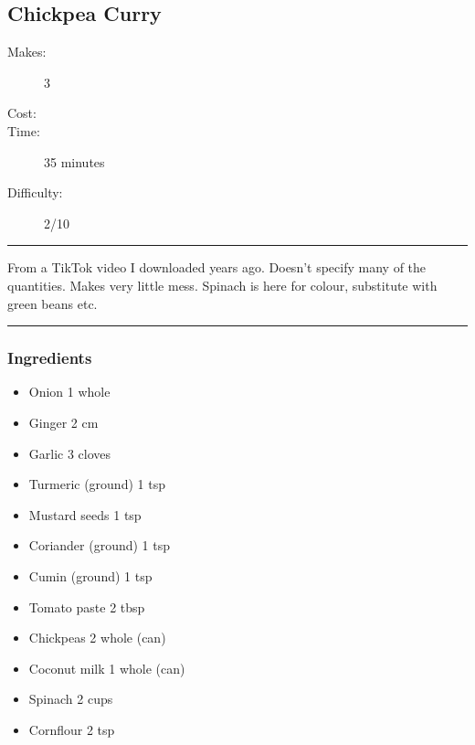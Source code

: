 \documentclass[]{article}
\begin{document}
\subsection*{\center\huge Chickpea Curry}
\begin{description}
\item[Makes:] 3 
\item[Cost:] \textdollar
\item[Time:] 35 minutes
\item[Difficulty:] 2/10
\end{description}
\vspace{0.2cm}\hrule\vspace{0.5cm}
\begin{adjustwidth}{0.5 cm}{0.5 cm}

From a TikTok video I downloaded years ago. Doesn't specify many of the quantities. Makes very little mess. Spinach is here for colour, substitute with green beans etc. \hfill{}\color{black}

\end{adjustwidth}
\vspace{0.5cm}\hrule
\subsubsection*{\Large Ingredients}
\begin{multicols}{2}
\begin{itemize}
 \item Onion \hfill 1 whole
 \item Ginger \hfill 2 cm
 \item Garlic \hfill 3 cloves
 \item Turmeric (ground) \hfill 1 tsp
 \item Mustard seeds \hfill 1 tsp
 \item Coriander (ground) \hfill 1 tsp
 \item Cumin (ground) \hfill 1 tsp
 \item Tomato paste \hfill 2 tbsp
 \item Chickpeas \hfill 2 whole (can)
 \item Coconut milk \hfill 1 whole (can)
 \item Spinach \hfill 2 cups
 \item Cornflour \hfill 2 tsp
\end{itemize}
\end{multicols}
\end{document}
